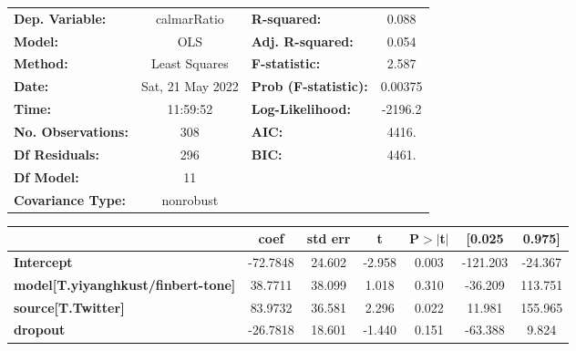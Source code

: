 \begin{center}
\begin{tabular}{lclc}
\toprule
\textbf{Dep. Variable:}                    &   calmarRatio    & \textbf{  R-squared:         } &     0.088   \\
\textbf{Model:}                            &       OLS        & \textbf{  Adj. R-squared:    } &     0.054   \\
\textbf{Method:}                           &  Least Squares   & \textbf{  F-statistic:       } &     2.587   \\
\textbf{Date:}                             & Sat, 21 May 2022 & \textbf{  Prob (F-statistic):} &  0.00375    \\
\textbf{Time:}                             &     11:59:52     & \textbf{  Log-Likelihood:    } &   -2196.2   \\
\textbf{No. Observations:}                 &         308      & \textbf{  AIC:               } &     4416.   \\
\textbf{Df Residuals:}                     &         296      & \textbf{  BIC:               } &     4461.   \\
\textbf{Df Model:}                         &          11      & \textbf{                     } &             \\
\textbf{Covariance Type:}                  &    nonrobust     & \textbf{                     } &             \\
\bottomrule
\end{tabular}
\begin{tabular}{lcccccc}
                                           & \textbf{coef} & \textbf{std err} & \textbf{t} & \textbf{P$> |$t$|$} & \textbf{[0.025} & \textbf{0.975]}  \\
\midrule
\textbf{Intercept}                         &     -72.7848  &       24.602     &    -2.958  &         0.003        &     -121.203    &      -24.367     \\
\textbf{model[T.yiyanghkust/finbert-tone]} &      38.7711  &       38.099     &     1.018  &         0.310        &      -36.209    &      113.751     \\
\textbf{source[T.Twitter]}                 &      83.9732  &       36.581     &     2.296  &         0.022        &       11.981    &      155.965     \\
\textbf{dropout}                           &     -26.7818  &       18.601     &    -1.440  &         0.151        &      -63.388    &        9.824     \\

\end{tabular}
\end{center}
